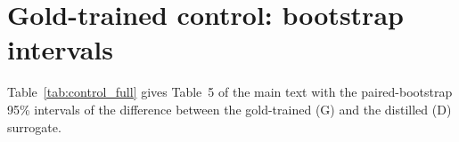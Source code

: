 \section{Gold-trained control: bootstrap intervals}

Table~\ref{tab:control_full} gives Table~5 of the main text with the paired-bootstrap 95\% intervals of the difference between the gold-trained (G) and the distilled (D) surrogate.

\begin{table}[H]
\centering
\scriptsize
\setlength{\tabcolsep}{4pt}
\caption{Gold-trained control with intervals. \(\Delta\): gold-trained minus distilled surrogate, with a paired-bootstrap 95\% interval.}
\label{tab:control_full}
\end{table}
